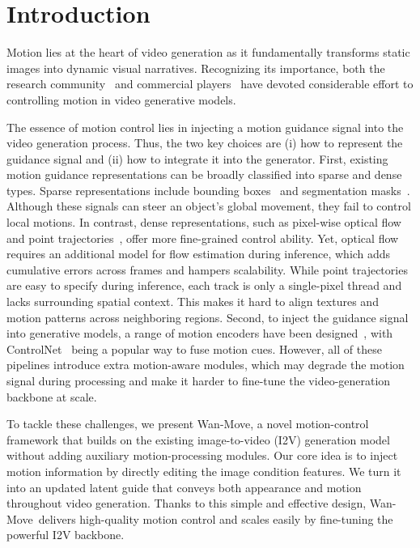 \documentclass{article}
\newcommand{\method}{Wan-Move}
\begin{document}
\section{Introduction}

Motion lies at the heart of video generation as it fundamentally transforms static images into dynamic visual narratives.
% 
Recognizing its importance, both the research community~\cite{wu2024draganything,yin2023dragnuwa,burgert2025gowiththeflow} and commercial players~\cite{kuaishou2024kling,runway2024gen3,kong2024hunyuanvideo} have devoted considerable effort to controlling motion in video generative models.

The essence of motion control lies in injecting a motion guidance signal into the video generation process.
Thus, the two key choices are (i) how to represent the guidance signal and (ii) how to integrate it into the generator.
First, existing motion guidance representations can be broadly classified into sparse and dense types.
Sparse representations include bounding boxes~\cite{motionbooth,wang2024boximator} and segmentation masks~\cite{wu2024draganything,dai2023animateanything,zhou2025trackgo}.
Although these signals can steer an object's global movement, they fail to control local motions. In contrast, dense representations, such as pixel-wise optical flow~\cite{yin2023dragnuwa, koroglu2024onlyflow,shi2024motioni2v,burgert2025gowiththeflow} and point trajectories~\cite{geng2024motion,zhang2024tora}, offer more fine-grained control ability. Yet, optical flow requires an additional model for flow estimation during inference, which adds cumulative errors across frames and hampers scalability. While point trajectories are easy to specify during inference, each track is only a single-pixel thread and lacks surrounding spatial context. This makes it hard to align textures and motion patterns across neighboring regions.
Second, to inject the guidance signal into generative models, a range of motion encoders have been designed~\cite{zhang2024tora,wang2024motionctrl,wu2024draganything,geng2024motion,wang2024levitor,chen2025disco}, with ControlNet~\cite{controlnet} being a popular way to fuse motion cues.
However, all of these pipelines introduce extra motion-aware modules, which may degrade the motion signal during processing and make it harder to fine-tune the video-generation backbone at scale.

To tackle these challenges, we present \method, a novel motion-control framework that builds on the existing image-to-video (I2V) generation model without adding auxiliary motion-processing modules.
Our core idea is to inject motion information by directly editing the image condition features. We turn it into an updated latent guide that conveys both appearance and motion throughout video generation.
Thanks to this simple and effective design, \method~delivers high-quality motion control and scales easily by fine-tuning the powerful I2V backbone.
\end{document}
